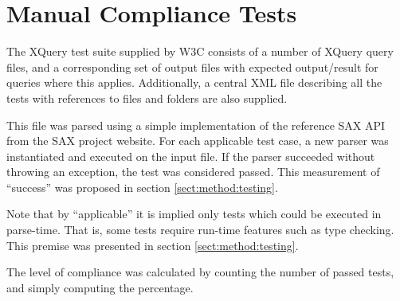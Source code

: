 \section{Manual Compliance Tests}
\label{sect:implementation:manualCoverage}
The XQuery test suite supplied by W3C\cite{w3c05} consists of a number of
XQuery query files, and a corresponding set of output files with expected
output/result for queries where this applies. Additionally, a central XML file
describing all the tests with references to files and folders are also supplied.

This file was parsed using a simple implementation of the reference SAX API
from the SAX project website\cite{saxproject}. For each applicable
test case, a new parser was instantiated and executed on the input file. If the
parser succeeded without throwing an exception, the test was considered passed.
This measurement of ``success'' was proposed in section \ref{sect:method:testing}.

Note that by ``applicable'' it is implied only tests which could be executed in
parse-time. That is, some tests require run-time features such as type
checking. This premise was presented in section \ref{sect:method:testing}.

The level of compliance was calculated by counting the number of passed tests, and
simply computing the percentage.